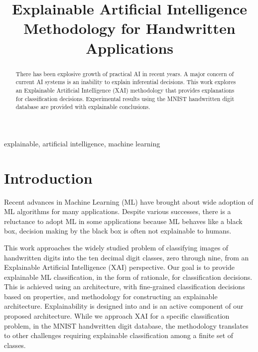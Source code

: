 \documentclass[conference]{IEEEtran}
\begin{document}
\title{Explainable Artificial Intelligence \\ {Methodology for Handwritten Applications}}

\author{

}

\maketitle

\begin{abstract}
There has been explosive growth of practical AI in recent years.
A major concern of current AI systems is an inability to explain inferential decisions.
This work explores an Explainable Artificial Intelligence (XAI) methodology that provides explanations
for classification decisions.  Experimental results using the MNIST handwritten digit database are provided with explainable conclusions.
\end{abstract}

\begin{IEEEkeywords}
explainable, artificial intelligence, machine learning
\end{IEEEkeywords}

\section{Introduction}

Recent advances in Machine Learning (ML) have brought about wide adoption of ML algorithms for many applications.  Despite various successes, there is a reluctance to adopt ML in some applications because ML behaves like a black box, decision making by the black box is often not explainable to humans.  

This work approaches the widely studied problem of classifying images of handwritten digits into the ten decimal digit classes, zero through nine, from an Explainable Artificial Intelligence (XAI) perspective.  Our goal is to provide explainable ML classification, in the form of rationale, for classification decisions.  This is achieved using an architecture, with fine-grained classification decisions based on properties, and methodology for constructing an explainable architecture.  Explainability is designed into and is an active component of our proposed architecture\cite{Arrieta2020ExplainableAI}.  While we approach XAI for a specific classification problem, in the MNIST handwritten digit database, the methodology translates to other challenges requiring explainable classification among a finite set of classes.
\end{document}
